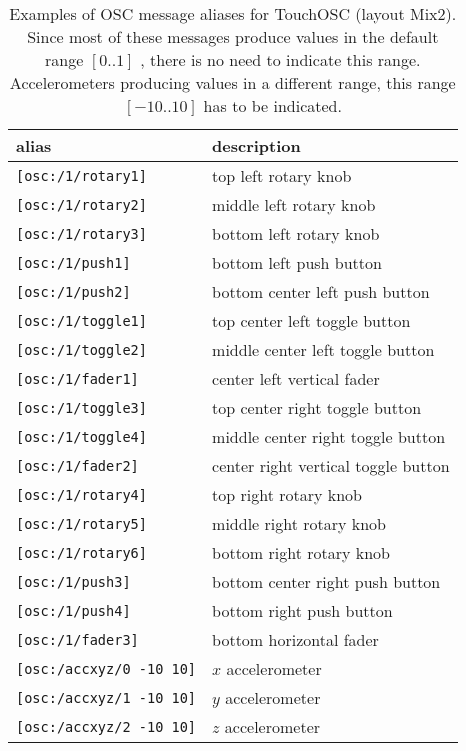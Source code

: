 \begin{table}[htdp]
\begin{center}
\begin{tabular}{|l|l|}
\hline
\bf{alias} 	& \bf{description}	\\
\hline
\lstinline'[osc:/1/rotary1]' & top left rotary knob\\
\lstinline'[osc:/1/rotary2]' & middle left rotary knob\\
\lstinline'[osc:/1/rotary3]' & bottom left rotary knob\\
\lstinline'[osc:/1/push1]' & bottom left push button\\
\lstinline'[osc:/1/push2]' & bottom center left push button\\
\hline
\lstinline'[osc:/1/toggle1]' & top center left toggle button\\
\lstinline'[osc:/1/toggle2]' & middle center left toggle button\\
\lstinline'[osc:/1/fader1]' & center left vertical fader\\
\hline
\lstinline'[osc:/1/toggle3]' & top center right toggle button\\
\lstinline'[osc:/1/toggle4]' & middle center right toggle button\\
\lstinline'[osc:/1/fader2]' & center right vertical toggle button\\
\hline
\lstinline'[osc:/1/rotary4]' & top right rotary knob\\
\lstinline'[osc:/1/rotary5]' & middle right rotary knob\\
\lstinline'[osc:/1/rotary6]' & bottom right rotary knob\\
\lstinline'[osc:/1/push3]' & bottom center right push button\\
\lstinline'[osc:/1/push4]' & bottom right push button\\
\hline
\lstinline'[osc:/1/fader3]' & bottom horizontal fader\\
\hline
\lstinline'[osc:/accxyz/0 -10 10]' &  $x$ accelerometer\\
\lstinline'[osc:/accxyz/1 -10 10]' &  $y$ accelerometer\\
\lstinline'[osc:/accxyz/2 -10 10]' &  $z$ accelerometer\\
\hline
\end{tabular}
\end{center}
\caption{Examples of OSC message aliases for TouchOSC (layout Mix2). Since most of these messages produce values in the default range $[0..1]$ , there is no need to indicate this range. Accelerometers producing values in a different range, this range $[-10..10]$ has to be indicated. }
\label{tab:oscalias}
\end{table}


